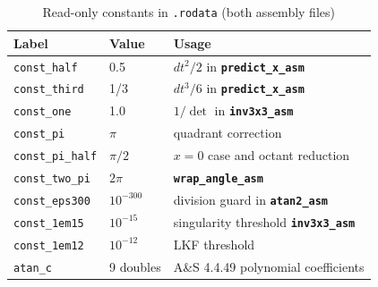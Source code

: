 \documentclass[12pt,a4paper]{article}
\newcommand{\func}[1]{\texttt{\bfseries #1}}
\begin{document}
\begin{table}[H]
\centering
\caption{Read-only constants in \texttt{.rodata} (both assembly files)}
\begin{tabular}{lll}
\toprule
\textbf{Label} & \textbf{Value} & \textbf{Usage} \\
\midrule
\texttt{const\_half}    & 0.5          & $dt^2/2$ in \func{predict\_x\_asm} \\
\texttt{const\_third}   & 1/3          & $dt^3/6$ in \func{predict\_x\_asm} \\
\texttt{const\_one}     & 1.0          & $1/\det$ in \func{inv3x3\_asm} \\
\texttt{const\_pi}      & $\pi$        & quadrant correction \\
\texttt{const\_pi\_half}& $\pi/2$      & $x=0$ case and octant reduction \\
\texttt{const\_two\_pi} & $2\pi$       & \func{wrap\_angle\_asm} \\
\texttt{const\_eps300}  & $10^{-300}$  & division guard in \func{atan2\_asm} \\
\texttt{const\_1em15}   & $10^{-15}$   & singularity threshold \func{inv3x3\_asm} \\
\texttt{const\_1em12}   & $10^{-12}$   & LKF threshold \\
\texttt{atan\_c}        & 9 doubles    & A\&S 4.4.49 polynomial coefficients \\
\bottomrule
\end{tabular}
\end{table}
\end{document}
